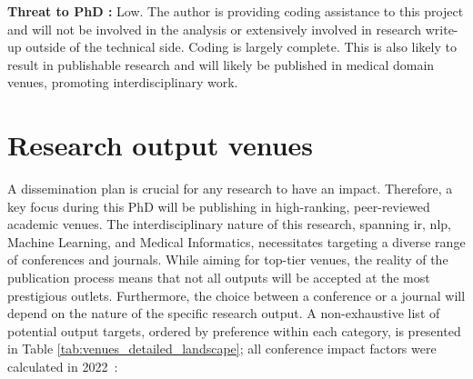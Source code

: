 \documentclass[10pt,oneside]{book}
\begin{document}
\textbf{Threat to PhD :} Low. The author is providing coding assistance to this project and will not be involved in the analysis or extensively involved in research write-up outside of the technical side. Coding is largely complete. This is also likely to result in publishable research and will likely be published in medical domain venues, promoting interdisciplinary work.


\section{Research output venues}

A dissemination plan is crucial for any research to have an impact. Therefore, a key focus during this PhD will be publishing in high-ranking, peer-reviewed academic venues. The interdisciplinary nature of this research, spanning \gls*{ir}, \gls*{nlp}, Machine Learning, and Medical Informatics, necessitates targeting a diverse range of conferences and journals. While aiming for top-tier venues, the reality of the publication process means that not all outputs will be accepted at the most prestigious outlets. Furthermore, the choice between a conference or a journal will depend on the nature of the specific research output. A non-exhaustive list of potential output targets, ordered by preference within each category, is presented in Table \ref{tab:venues_detailed_landscape}; all conference impact factors were calculated in 2022~\cite{eickhoff_impact_2023}:
\end{document}
